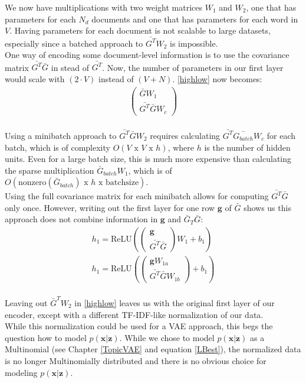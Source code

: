 \documentclass{report}
\begin{document}
	We now have multiplications with two weight matrices $W_1$ and $W_2$, one that has parameters for each $N_d$ documents and one that has parameters for each word in $V$. Having parameters for each document is not scalable to large datasets, especially since a batched approach to $\bar{G^T}W_2$ is impossible.\\
	One way of encoding some document-level information is to use the covariance matrix $\bar{G^T}\bar{G}$ in stead of $\bar{G^T}$. Now, the number of parameters in our first layer would scale with $(2\cdot V)$ instead of $(V+N)$. \ref{highlow} now becomes:
	\\
	\begin{align}
	\left(\begin{matrix}
	\bar{G}W_1 \\
	\bar{G^T}\bar{G}W_c
	\end{matrix}\right)
	\end{align}
	\\
	Using a minibatch approach to $\bar{G^T}\bar{G}W_2$ requires calculating $\bar{G^T}\bar{G_{batch}}W_c$ for each batch, which is of complexity $O(V\text{ x }V \text{ x } h)$, where $h$ is the number of hidden units. Even for a large batch size, this is much more expensive than calculating the sparse multiplication $\bar{G}_{batch}W_1$, which is of $O(\text{nonzero}(\bar{G}_{batch}) \text{ x } h \text{ x } \text{batchsize})$. 
	\\
	Using the full covariance matrix for each minibatch allows for computing $\bar{G^T}\bar{G}$ only once. However, writing out the first layer for one row $\mathbf{g}$ of $\bar{G}$ shows us this approach does not combine information in $\mathbf{g}$ and $\bar{G}_T\bar{G}$:
	\begin{align}
	h_1 = \text{ReLU}(
	\left(\begin{matrix}
	\mathbf{g} \\
	\bar{G^T}\bar{G}
	\end{matrix}\right)W_1 +b_1)
	\\
	h_1 = 
	\text{ReLU}(\left(\begin{matrix}
	\mathbf{g}W_{1a} \\
	\bar{G^T}\bar{G}W_{1b}
	\end{matrix}\right) + b_1)
	\end{align}
	\\
	Leaving out $\bar{G}^TW_2$ in \ref{highlow} leaves us with the original first layer of our encoder, except with a different TF-IDF-like normalization of our data. \\ While this normalization could be used for a VAE approach, this begs the question how to model $p(\mathbf{x|z})$. While we chose to model $p(\mathbf{x|z})$ as a Multinomial (see Chapter \ref{TopicVAE} and equation \ref{LBest}), the normalized data is no longer Multinomially distributed and there is no obvious choice for modeling $p(\mathbf{x|z})$.\\
\end{document}
